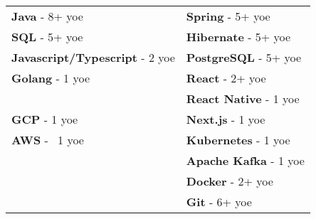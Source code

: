 \documentclass{modernsimplecv}
\newlength{\rightcolwidth}
\begin{document}
\begin{paracol}{2}
        \begin{skillsection}{\rightcolwidth}
            \begin{tabular}{l p{}}
                {\textbf{Java} - 8+ yoe} & {\textbf{Spring} - 5+ yoe} \\
                {\textbf{SQL} - 5+ yoe} & {\textbf{Hibernate} - 5+ yoe} \\
                {\textbf{Javascript/Typescript} - 2 yoe} & {\textbf{PostgreSQL} - 5+ yoe} \\
                {\textbf{Golang} - 1 yoe} & {\textbf{React} - 2+ yoe} \\
                {} & {\textbf{React Native} - 1 yoe} \\
                {\textbf{GCP} - 1 yoe} & {\textbf{Next.js} - 1 yoe} \\
                {\textbf{AWS} - ~1 yoe} & {\textbf{Kubernetes} - 1 yoe} \\
                {} & {\textbf{Apache Kafka} - 1 yoe} \\
                {} & {\textbf{Docker} - 2+ yoe} \\
                {} & {\textbf{Git} - 6+ yoe} \\
            \end{tabular}
            

        \end{skillsection}
    
        \vspace{2em}
        \bigskip
    
    \end{paracol}
\end{document}
